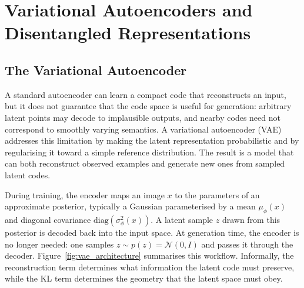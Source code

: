
\section{Variational Autoencoders and Disentangled Representations}
\label{sec:vae_disentanglement}

\subsection{The Variational Autoencoder}

A standard autoencoder can learn a compact code that reconstructs an input, but it does
not guarantee that the code space is useful for generation: arbitrary latent points may
decode to implausible outputs, and nearby codes need not correspond to smoothly varying
semantics. A variational autoencoder (VAE) addresses this limitation by making the latent
representation probabilistic and by regularising it toward a simple reference distribution.
The result is a model that can both reconstruct observed examples and generate new ones
from sampled latent codes.

During training, the encoder maps an image $x$ to the parameters of an approximate
posterior, typically a Gaussian parameterised by a mean $\mu_\phi(x)$ and diagonal
covariance $\mathrm{diag}(\sigma_\phi^2(x))$. A latent sample $z$ drawn from this posterior
is decoded back into the input space. At generation time, the encoder is no longer
needed: one samples $z \sim p(z) = \mathcal{N}(0, I)$ and passes it through the decoder.
Figure~\ref{fig:vae_architecture}
summarises this workflow. Informally, the reconstruction term determines what information
the latent code must preserve, while the KL term determines the geometry that the latent
space must obey.

